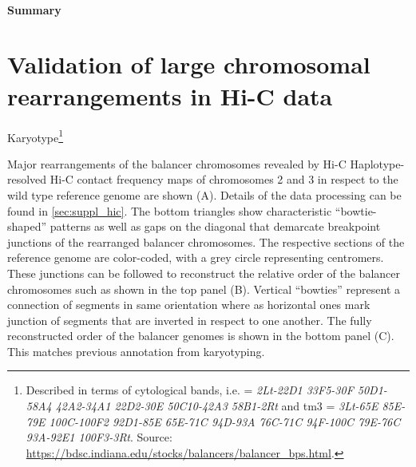 \paragraph{Summary}



\section{Validation of large chromosomal rearrangements in Hi-C data}
\label{sec:balancer_hic_svs}

Karyotype\footnote{
    Described in terms of cytological bands, i.e. \cyo = \textit{2Lt-22D1
    33F5-30F 50D1-58A4 42A2-34A1 22D2-30E 50C10-42A3 58B1-2Rt} and
    \ac{tm3} = \textit{3Lt-65E 85E-79E 100C-100F2 92D1-85E 65E-71C
    94D-93A 76C-71C 94F-100C 79E-76C 93A-92E1 100F3-3Rt}.
    Source: \url{https://bdsc.indiana.edu/stocks/balancers/balancer_bps.html}.}

    {Major rearrangements of the balancer chromosomes revealed by Hi-C}{
    Haplotype-resolved Hi-C contact frequency maps of chromosomes 2 and 3 in
    respect to the wild type reference genome are shown (A). Details of the data
    processing can be found in \cref{sec:suppl_hic}. The bottom triangles show
    characteristic ``bowtie-shaped'' patterns as well as gaps on the diagonal
    that demarcate breakpoint junctions of the rearranged balancer chromosomes.
    The respective sections of the reference genome are color-coded, with a grey
    circle representing centromers.
    These junctions can be followed to reconstruct the relative order of the
    balancer chromosomes such as shown in the top panel (B). Vertical ``bowties''
    represent a connection of segments in same orientation where as horizontal
    ones mark junction of segments that are inverted in respect to one another.
    The fully reconstructed order of the balancer genomes is shown in the bottom
    panel (C). This matches previous annotation from karyotyping\footnotemark.}






